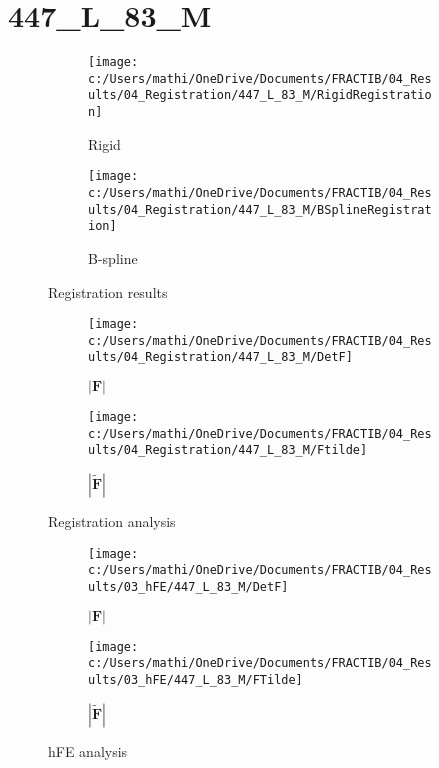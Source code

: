 \documentclass{article}%
\begin{document}
%
\newpage%
\section*{447\_L\_83\_M}%
\label{sec:447L83M}%


\begin{figure}[h!]%
\begin{subfigure}[b]{0.5\linewidth}%
\texttt{[image: c:/Users/mathi/OneDrive/Documents/FRACTIB/04\_Results/04\_Registration/447\_L\_83\_M/RigidRegistration]}%
\caption{Rigid}%
\end{subfigure}%
\begin{subfigure}[b]{0.5\linewidth}%
\texttt{[image: c:/Users/mathi/OneDrive/Documents/FRACTIB/04\_Results/04\_Registration/447\_L\_83\_M/BSplineRegistration]}%
\caption{B{-}spline}%
\end{subfigure}%
\caption{Registration results}%
\end{figure}

%


\begin{figure}[h!]%
\begin{subfigure}[b]{0.5\linewidth}%
\texttt{[image: c:/Users/mathi/OneDrive/Documents/FRACTIB/04\_Results/04\_Registration/447\_L\_83\_M/DetF]}%
\caption{$|\mathbf{F}|$}%
\end{subfigure}%
\begin{subfigure}[b]{0.5\linewidth}%
\texttt{[image: c:/Users/mathi/OneDrive/Documents/FRACTIB/04\_Results/04\_Registration/447\_L\_83\_M/Ftilde]}%
\caption{$|\widetilde{\mathbf{F}}|$}%
\end{subfigure}%
\caption{Registration analysis}%
\end{figure}

%


\begin{figure}[h!]%
\begin{subfigure}[b]{0.5\linewidth}%
\texttt{[image: c:/Users/mathi/OneDrive/Documents/FRACTIB/04\_Results/03\_hFE/447\_L\_83\_M/DetF]}%
\caption{$|\mathbf{F}|$}%
\end{subfigure}%
\begin{subfigure}[b]{0.5\linewidth}%
\texttt{[image: c:/Users/mathi/OneDrive/Documents/FRACTIB/04\_Results/03\_hFE/447\_L\_83\_M/FTilde]}%
\caption{$|\widetilde{\mathbf{F}}|$}%
\end{subfigure}%
\caption{hFE analysis}%
\end{figure}
\end{document}
